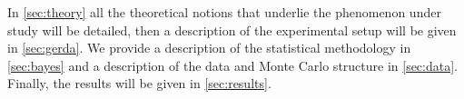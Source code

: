 	In \cref{sec:theory} all the theoretical notions that underlie the phenomenon under study will be detailed, then a description of the {\gerda} experimental setup will be given in \cref{sec:gerda}. We provide a description of the statistical methodology in \cref{sec:bayes} and a description of the data and Monte Carlo structure in \cref{sec:data}. Finally, the results will be given in \cref{sec:results}.
